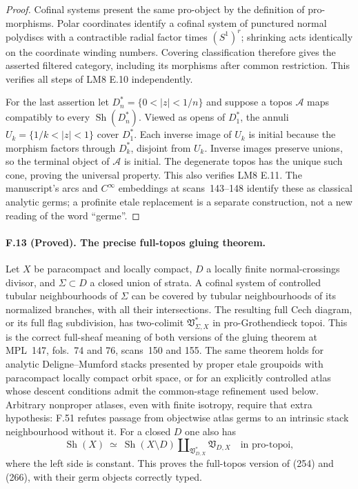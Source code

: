 \begin{proof}
Cofinal systems present the same pro-object by the definition of
pro-morphisms. Polar coordinates identify a cofinal system of punctured
normal polydiscs with a contractible radial factor times $(S^1)^r$;
shrinking acts identically on the coordinate winding numbers. Covering
classification therefore gives the asserted filtered category, including
its morphisms after common restriction. This verifies all steps of
LM8 E.10 independently.

For the last assertion let $D_n^*=\{0<|z|<1/n\}$ and suppose a topos
$\mathcal A$ maps compatibly to every $\operatorname{Sh}(D_n^*)$. Viewed
as opens of $D_1^*$, the annuli $U_k=\{1/k<|z|<1\}$ cover $D_1^*$.
Each inverse image of $U_k$ is initial because the morphism factors
through $D_k^*$, disjoint from $U_k$. Inverse images preserve unions,
so the terminal object of $\mathcal A$ is initial. The degenerate topos
has the unique such cone, proving the universal property. This also
verifies LM8 E.11. The manuscript's arcs and $C^\infty$ embeddings at
scans~143--148 identify these as classical analytic germs; a profinite
etale replacement is a separate construction, not a new reading of the
word ``germe''.
\end{proof}

\paragraph{F.13 (Proved). The precise full-topos gluing theorem.}
Let $X$ be paracompact and locally compact, $D$ a locally finite
normal-crossings divisor, and $\Sigma\subset D$ a closed union of
strata. A cofinal system of controlled tubular neighbourhoods of $\Sigma$
can be covered by tubular neighbourhoods of its normalized branches,
with all their intersections. The resulting full Cech diagram, or its
full flag subdivision, has two-colimit
$\mathfrak V^*_{\Sigma,X}$ in pro-Grothendieck topoi. This is the correct
full-sheaf meaning of both versions of the gluing theorem at MPL~147,
fols.~74 and 76, scans~150 and 155. The same theorem holds for analytic
Deligne--Mumford stacks presented by proper etale groupoids with
paracompact locally compact orbit space, or for an explicitly controlled
atlas whose descent conditions admit the common-stage refinement used
below. Arbitrary nonproper atlases, even with finite isotropy, require
that extra hypothesis: F.51 refutes passage from objectwise atlas germs to
an intrinsic stack neighbourhood without it. For a closed $D$ one also has
\[
 \operatorname{Sh}(X)\ \simeq\
 \operatorname{Sh}(X\setminus D)
       \amalg_{\mathfrak V^*_{D,X}}\mathfrak V_{D,X}
 \quad\text{in pro-topoi},
\]
where the left side is constant. This proves the full-topos version of
(254) and (266), with their germ objects correctly typed.

